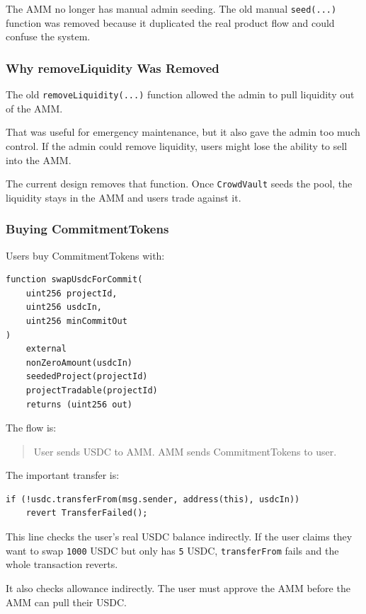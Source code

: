 \documentclass[11pt,a4paper]{article}
\begin{document}
The AMM no longer has manual admin seeding. The old manual \texttt{seed(...)} function was removed because it duplicated the real product flow and could confuse the system.

\subsubsection{Why removeLiquidity Was Removed}

The old \texttt{removeLiquidity(...)} function allowed the admin to pull liquidity out of the AMM.

That was useful for emergency maintenance, but it also gave the admin too much control. If the admin could remove liquidity, users might lose the ability to sell into the AMM.

The current design removes that function. Once \texttt{CrowdVault} seeds the pool, the liquidity stays in the AMM and users trade against it.

\subsubsection{Buying CommitmentTokens}

Users buy CommitmentTokens with:

\begin{lstlisting}
function swapUsdcForCommit(
    uint256 projectId,
    uint256 usdcIn,
    uint256 minCommitOut
)
    external
    nonZeroAmount(usdcIn)
    seededProject(projectId)
    projectTradable(projectId)
    returns (uint256 out)
\end{lstlisting}

The flow is:

\begin{quote}
User sends USDC to AMM. AMM sends CommitmentTokens to user.
\end{quote}

The important transfer is:

\begin{lstlisting}
if (!usdc.transferFrom(msg.sender, address(this), usdcIn))
    revert TransferFailed();
\end{lstlisting}

This line checks the user's real USDC balance indirectly. If the user claims they want to swap \texttt{1000} USDC but only has \texttt{5} USDC, \texttt{transferFrom} fails and the whole transaction reverts.

It also checks allowance indirectly. The user must approve the AMM before the AMM can pull their USDC.
\end{document}
